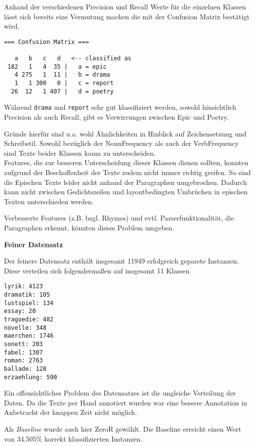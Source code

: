 \documentclass[]{article}
\begin{document}
Anhand der verschiedenen Precision und Recall Werte für die einzelnen
Klassen lässt sich bereits eine Vermutung machen die mit der Confusion
Matrix bestätigt wird.

\begin{verbatim}
=== Confusion Matrix ===

   a   b   c   d   <-- classified as
 182   1   4  35 |   a = epic
   4 275   1  11 |   b = drama
   1   1 300   0 |   c = report
  26  12   1 407 |   d = poetry
\end{verbatim}

Während \texttt{drama} und \texttt{report} sehr gut klassifiziert
werden, sowohl hinsichtlich Precision als auch Recall, gibt es
Verwirrungen zwischen Epic und Poetry.

Gründe hierfür sind u.a. wohl Ähnlichkeiten in Hinblick auf
Zeichensetzung und Schreibstil. Sowohl bezüglich der NounFrequency als
auch der VerbFrequency sind Texte beider Klassen kaum zu
unterscheiden.\\
Features, die zur besseren Unterscheidung dieser Klassen dienen sollten,
konnten aufgrund der Beschaffenheit der Texte zudem nicht immer richtig
greifen. So sind die Epischen Texte leider nicht anhand der Paragraphen
umgebrochen. Dadurch kann nicht zwischen Gedichtszeilen und
layoutbedingten Umbrüchen in epischen Texten unterschieden werden.

Verbesserte Features (z.B. bzgl. Rhymes) und evtl. Parserfunktionalität,
die Paragraphen erkennt, könnten dieses Problem umgeben.

\textbf{Feiner Datensatz}

Der feinere Datensatz enthält insgesamt 11949 erfolgreich geparste
Instanzen. Diese verteilen sich folgendermaßen auf insgesamt 11 Klassen

\begin{verbatim}
lyrik: 4123
dramatik: 105
lustspiel: 134
essay: 20
tragoedie: 482
novelle: 348
maerchen: 1746
sonett: 203
fabel: 1307
roman: 2763
ballade: 128
erzaehlung: 590
\end{verbatim}

Ein offensichtliches Problem des Datensatzes ist die ungleiche
Verteilung der Daten. Da die Texte per Hand annotiert wurden war eine
bessere Annotation in Anbetracht der knappen Zeit nicht möglich.

Als \emph{Baseline} wurde auch hier ZeroR gewählt. Die Baseline erreicht
einen Wert von 34.505\% korrekt klassifizierten Instanzen.
\end{document}
